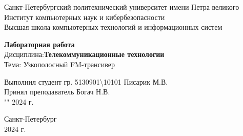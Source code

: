 \begingroup
\fontsize{12pt}{14pt}\selectfont

\begin{center}

    Санкт-Петербургский политехнический университет имени Петра великого\\
    Институт компьютерных наук и кибербезопасности\\
    Высшая школа компьютерных технологий и информационных систем\\

    \vspace{\fill}

    \onehalfspacing
    \textbf{\huge Лабораторная работа }\\
    \medbreak
    Дисциплина:\textbf{Телекоммуникационные технологии}\\
    Тема: Узкополосный FM-трансивер\textbf{}\\
    \vspace{1.5cm}
\end{center}


\begin{flushright}
    \doublespacing
    Выполнил студент гр. 5130901{\textbackslash}10101 \underline{\hspace{7em}} Писарик М.В.\\
    \smallskip
    Принял преподаватель \uline{\hspace{7em}}Богач Н.В. \\
    \smallskip
    "\uline{\hspace{1.5em}}" \uline{\hspace{5em}} 2024 г.\\
\end{flushright}

\vspace{\fill}

\begin{center}
    Санкт-Петербург\\
    2024 г.\\
\end{center}

\singlespacing

\pagebreak

\endgroup

